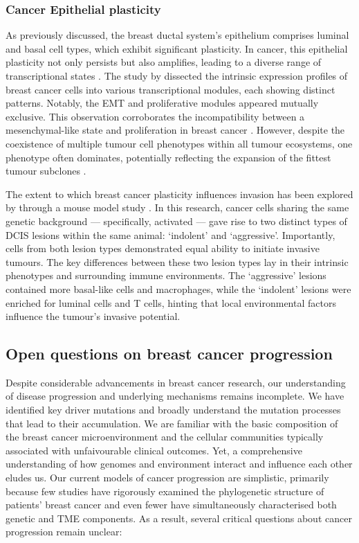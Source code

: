 \subsubsection*{Cancer Epithelial plasticity}

As previously discussed, the breast ductal system's epithelium comprises luminal and basal cell types, which exhibit significant plasticity. In cancer, this epithelial plasticity not only persists but also amplifies, leading to a diverse range of transcriptional states \parencite{Wagner2019-zp, Wu2021-uq, Pal2021-rf}. The study by \textcite{Wu2021-uq} dissected the intrinsic expression profiles of breast cancer cells into various transcriptional modules, each showing distinct patterns. Notably, the \acf{EMT} and proliferative modules appeared mutually exclusive. This observation corroborates the incompatibility between a mesenchymal-like state and proliferation in breast cancer \parencite{Tsai2012-hb}. However, despite the coexistence of multiple tumour cell phenotypes within all tumour ecosystems, one phenotype often dominates, potentially reflecting the expansion of the fittest tumour subclones \parencite{Wagner2019-zp}.

The extent to which breast cancer plasticity influences invasion has been explored by \textcite{Sinha2021-mf} through a mouse model study . In this research, cancer cells sharing the same genetic background — specifically, activated  — gave rise to two distinct types of \ac{DCIS} lesions within the same animal: `indolent' and `aggressive'. Importantly, cells from both lesion types demonstrated equal ability to initiate invasive tumours. The key differences between these two lesion types lay in their intrinsic phenotypes and surrounding immune environments. The `aggressive' lesions contained more basal-like cells and macrophages, while the `indolent' lesions were enriched for luminal cells and T cells, hinting that local environmental factors influence the tumour's invasive potential.

\subsection{Open questions on breast cancer progression}

Despite considerable advancements in breast cancer research, our understanding of disease progression and underlying mechanisms remains incomplete. We have identified key driver mutations and broadly understand the mutation processes that lead to their accumulation. We are familiar with the basic composition of the breast cancer microenvironment and the cellular communities typically associated with unfaivourable clinical outcomes. Yet, a comprehensive understanding of how genomes and environment interact and influence each other eludes us. Our current models of cancer progression are simplistic, primarily because few studies have rigorously examined the phylogenetic structure of patients' breast cancer and even fewer have simultaneously characterised both genetic and \ac{TME} components. As a result, several critical questions about cancer progression remain unclear:

